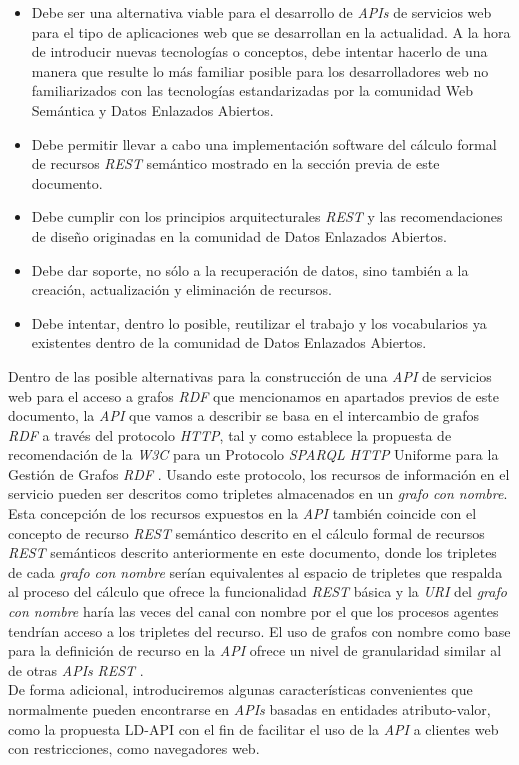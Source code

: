 \begin{itemize}
\item Debe ser una alternativa viable para el desarrollo de \textit{APIs} de servicios web para el tipo de aplicaciones web que se desarrollan en la actualidad. A la hora de introducir nuevas tecnolog\'ias o conceptos, debe intentar hacerlo de una manera que resulte lo m\'as familiar posible para los desarrolladores web no familiarizados con las tecnolog\'ias estandarizadas por la comunidad Web Sem\'antica y Datos Enlazados Abiertos.
\item Debe permitir llevar a cabo una implementaci\'on software del c\'alculo formal de recursos \textit{REST} sem\'antico mostrado en la secci\'on previa de este documento.
\item Debe cumplir con los principios arquitecturales \textit{REST} y las recomendaciones de dise\~no originadas en la comunidad de Datos Enlazados Abiertos.
\item Debe dar soporte, no s\'olo a la recuperaci\'on de datos, sino tambi\'en a la creaci\'on, actualizaci\'on y eliminaci\'on de recursos.
\item Debe intentar, dentro lo posible, reutilizar el trabajo y los vocabularios ya existentes dentro de la comunidad de Datos Enlazados Abiertos.
\end{itemize}

Dentro de las posible alternativas para la construcci\'on de una \textit{API} de servicios web para el acceso a grafos \textit{RDF} que mencionamos en apartados previos de este documento, la \textit{API} que vamos a describir se basa en el intercambio de grafos \textit{RDF} a trav\'es del protocolo \textit{HTTP}, tal y como establece la propuesta de recomendaci\'on de la \textit{W3C} para un  Protocolo \textit{SPARQL} \textit{HTTP} Uniforme para la Gesti\'on de Grafos \textit{RDF} \cite{ogbuji2011sparql}. Usando este protocolo, los recursos de informaci\'on en el servicio pueden ser descritos como tripletes almacenados en un \textit{grafo con nombre}. Esta concepci\'on de los recursos expuestos en la \textit{API} tambi\'en coincide con el concepto de recurso \textit{REST} sem\'antico descrito en el c\'alculo formal de recursos \textit{REST} sem\'anticos descrito anteriormente en este documento, donde  los tripletes de cada \textit{grafo con nombre} ser\'ian equivalentes al espacio de tripletes que respalda al proceso del c\'alculo que ofrece la funcionalidad \textit{REST} b\'asica y la \textit{URI} del \textit{grafo con nombre} har\'ia las veces del canal con nombre por el que los procesos agentes tendr\'ian acceso a los tripletes del recurso.
El uso de grafos con nombre como base para la definici\'on de recurso en la \textit{API} ofrece un nivel de granularidad similar al de otras \textit{APIs} \textit{REST} \cite{wilde2009restful}.\\
De forma adicional, introduciremos algunas caracter\'isticas convenientes que normalmente pueden encontrarse en \textit{APIs} basadas en entidades atributo-valor, como la propuesta LD-API \cite{ld_api} con el fin de facilitar el uso de la \textit{API} a clientes web con restricciones, como navegadores web.

